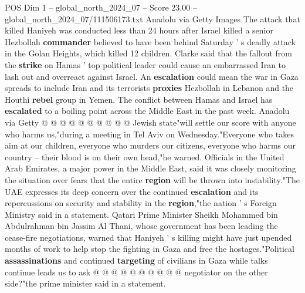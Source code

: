 \begin{textsample}{POS Dim 1 – global\_north\_2024\_07 – Score 23.00 – global\_north\_2024\_07/111506173.txt}
Anadolu via Getty Images The attack that killed Haniyeh was conducted less than 24 hours after Israel killed a senior Hezbollah \textbf{commander} believed to have been behind Saturday ' s deadly attack in the Golan Heights, which killed 12 children.
Clarke said that the fallout from the \textbf{strike} on Hamas ' top political leader could cause an embarrassed Iran to lash out and overreact against Israel.
An \textbf{escalation} could mean the war in Gaza spreads to include Iran and its terrorists \textbf{proxies} Hezbollah in Lebanon and the Houthi \textbf{rebel} group in Yemen.
The conflict between Hamas and Israel has \textbf{escalated} to a boiling point across the Middle East in the past week.
Anadolu via Getty @ @ @ @ @ @ @ @ @ @ Jewish state"will settle our score with anyone who harms us,"during a meeting in Tel Aviv on Wednesday."Everyone who takes aim at our children, everyone who murders our citizens, everyone who harms our country -- their blood is on their own head,"he warned.
Officials in the United Arab Emirates, a major power in the Middle East, said it was closely monitoring the situation over fears that the entire \textbf{region} will be thrown into instability."The UAE expresses its deep concern over the continued \textbf{escalation} and its repercussions on security and stability in the \textbf{region},"the nation ' s Foreign Ministry said in a statement.
Qatari Prime Minister Sheikh Mohammed bin Abdulrahman bin Jassim Al Thani, whose government has been leading the cease-fire negotiations, warned that Haniyeh ' s killing might have just upended months of work to help stop the fighting in Gaza and free the hostages."Political \textbf{assassinations} and continued \textbf{targeting} of civilians in Gaza while talks continue leads us to ask @ @ @ @ @ @ @ @ @ @ negotiator on the other side?"the prime minister said in a statement.

\end{textsample}
